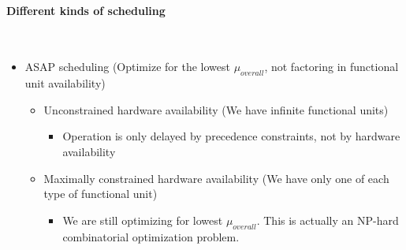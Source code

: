 \documentclass{article}
\begin{document}
\paragraph{Different kinds of scheduling}\mbox{}\\
\begin{itemize}
    \item ASAP scheduling (Optimize for the lowest $\mu_{overall}$, not factoring in functional unit availability)
        \begin{itemize}
            \item Unconstrained hardware availability (We have infinite functional units)
                \begin{itemize}
                    \item Operation is only delayed by precedence constraints, not by hardware availability
                \end{itemize}
            \item Maximally constrained hardware availability (We have only one of each type of functional unit)
                \begin{itemize}
                    \item We are still optimizing for lowest $\mu_{overall}$. This is actually an NP-hard combinatorial optimization problem.
                \end{itemize}
        \end{itemize}


\end{itemize}
\end{document}
